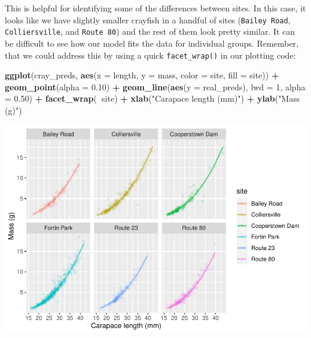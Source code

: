 \documentclass[
]{book}
\newenvironment{Shaded}{\begin{snugshade}}{\end{snugshade}}
\newcommand{\DataTypeTok}[1]{\textcolor[rgb]{0.13,0.29,0.53}{#1}}
\newcommand{\DecValTok}[1]{\textcolor[rgb]{0.00,0.00,0.81}{#1}}
\newcommand{\FloatTok}[1]{\textcolor[rgb]{0.00,0.00,0.81}{#1}}
\newcommand{\KeywordTok}[1]{\textcolor[rgb]{0.13,0.29,0.53}{\textbf{#1}}}
\newcommand{\NormalTok}[1]{#1}
\newcommand{\OperatorTok}[1]{\textcolor[rgb]{0.81,0.36,0.00}{\textbf{#1}}}
\newcommand{\StringTok}[1]{\textcolor[rgb]{0.31,0.60,0.02}{#1}}
\begin{document}
This is helpful for identifying some of the differences between sites. In this case, it looks like we have slightly smaller crayfish in a handful of sites (\texttt{Bailey\ Road}, \texttt{Colliersville}, and \texttt{Route\ 80}) and the rest of them look pretty similar. It can be difficult to see how our model fits the data for individual groups. Remember, that we could address this by using a quick \texttt{facet\_wrap()} in our plotting code:

\begin{Shaded}
\begin{Highlighting}[]
\KeywordTok{ggplot}\NormalTok{(cray_preds, }\KeywordTok{aes}\NormalTok{(}\DataTypeTok{x =}\NormalTok{ length, }\DataTypeTok{y =}\NormalTok{ mass, }\DataTypeTok{color =}\NormalTok{ site, }\DataTypeTok{fill =}\NormalTok{ site)) }\OperatorTok{+}
\StringTok{  }\KeywordTok{geom_point}\NormalTok{(}\DataTypeTok{alpha =} \FloatTok{0.10}\NormalTok{) }\OperatorTok{+}
\StringTok{  }\KeywordTok{geom_line}\NormalTok{(}\KeywordTok{aes}\NormalTok{(}\DataTypeTok{y =}\NormalTok{ real_preds), }\DataTypeTok{lwd =} \DecValTok{1}\NormalTok{, }\DataTypeTok{alpha =} \FloatTok{0.50}\NormalTok{) }\OperatorTok{+}
\StringTok{  }\KeywordTok{facet_wrap}\NormalTok{(}\OperatorTok{~}\NormalTok{site) }\OperatorTok{+}
\StringTok{  }\KeywordTok{xlab}\NormalTok{(}\StringTok{"Carapace length (mm)"}\NormalTok{) }\OperatorTok{+}
\StringTok{  }\KeywordTok{ylab}\NormalTok{(}\StringTok{"Mass (g)"}\NormalTok{)}
\end{Highlighting}
\end{Shaded}

\includegraphics{worstr_files/figure-latex/unnamed-chunk-382-1.pdf}
\end{document}
